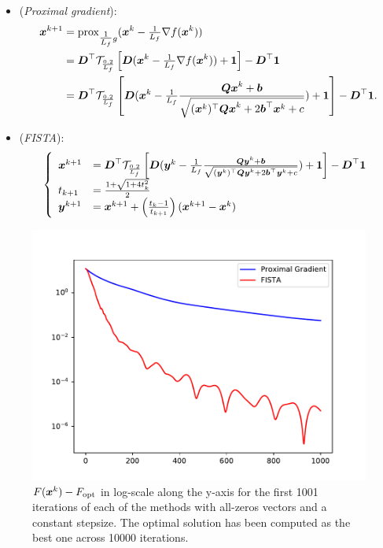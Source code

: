 \begin{itemize}
    \item (\emph{Proximal gradient}):
    \begin{align*}
    \begin{split}
        \boldsymbol x^{k+1} &= \operatorname{prox}_{{\textstyle\frac{1}{L_f}}g} (\boldsymbol x^k - {\textstyle\frac{1}{L_f}} \nabla f(\boldsymbol x^k)) \\ 
        &=  \boldsymbol D^\top 
       \mathcal T_{\frac{0.2}{L_f}} \left[ \boldsymbol D(\boldsymbol x^k - {\textstyle\frac{1}{L_f}} \nabla 
        f(\boldsymbol x^k) ) + \boldsymbol 1 \right]  - \boldsymbol D^\top  \boldsymbol 1    \\
        &= \boldsymbol D^\top  \mathcal T_{\frac{0.2}{L_f}} \left[ 
        \boldsymbol D(\boldsymbol x^k - {\textstyle\frac{1}{L_f}} \frac{\boldsymbol{Qx}^k+\boldsymbol b}{\sqrt{(\boldsymbol x^k)^\top 
        \boldsymbol{Qx}^k + 2 \boldsymbol b^\top \boldsymbol x^k + c}} ) + \boldsymbol 1 \right] - \boldsymbol D^\top \boldsymbol 1 .
    \end{split}
    \end{align*}
    
    \item (\emph{FISTA}):
      \begin{align*}
    \begin{split}
    \left\{
    \begin{array}{lll}
        \boldsymbol x^{k+1} &= \boldsymbol D^\top  \mathcal T_{\frac{0.2}{L_f}} \left[ 
        \boldsymbol D(\boldsymbol y^k - {\textstyle\frac{1}{L_f}} \frac{\boldsymbol{Qy}^k+\boldsymbol b}{\sqrt{(\boldsymbol y^k)^\top 
        \boldsymbol{Qy}^k + 2 \boldsymbol b^\top \boldsymbol y^k + c}} ) + \boldsymbol 1 \right] - \boldsymbol D^\top \boldsymbol 1 \\
        t_{k+1} &= \frac{1+\sqrt{1+4t_k^2}}{2} \\
        \boldsymbol y^{k+1} &= \boldsymbol x^{k+1} + \left( 
        \frac{t_k-1}{t_{k+1}} \right) (\boldsymbol x^{k+1}- \boldsymbol x^k)
    \end{array}
    \right.
    \end{split}
    \end{align*}
\end{itemize}
\begin{figure}[H]
    \centering
    \includegraphics[width=14cm]{images/part2_ex1.pdf}
    \caption{$F(\boldsymbol x^k)-F_{\text{opt}}$ in log-scale along the 
  y-axis for the first 1001 iterations of each of the methods 
  with all-zeros vectors and a constant stepsize. The optimal solution has been computed as the best one across 10000 iterations.  }
  \label{fig: ex0}
\end{figure}
